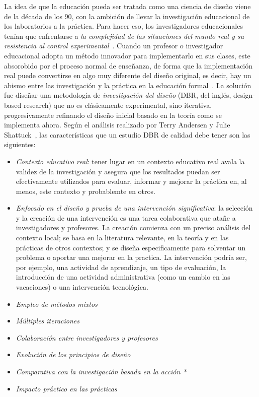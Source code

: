La idea de que la educación pueda ser tratada como una ciencia de diseño viene de la década de los 90, con la ambición de llevar la investigación educacional de los laboratorios a la práctica. Para hacer eso, los investigadores educacionales tenían que enfrentarse a \emph{la complejidad de las situaciones del mundo real y su resistencia al control experimental}~\cite{collins2004design}. Cuando un profesor o investigador educacional adopta un método innovador para implementarlo en sus clases, este absorobido por el proceso normal de enseñanza, de forma que la implementación real puede convertirse en algo muy diferente del diseño original, es decir, hay un abismo entre las investigación y la práctica en la educación formal~\cite{anderson2012design}. La solución fue diseñar una metodología de \emph{investigación del diseño} (DBR, del inglés, design-based research) que no es clásicamente experimental, sino iterativa, progresivamente refinando el diseño inicial basado en la teoría como se implementa ahora. Según el análisis realizado por Terry Andersen y Julie Shattuck~\cite{anderson2012design}, las características que un estudio DBR de calidad debe tener son las siguientes:
\begin{itemize}
\item \emph{Contexto educativo real}: tener lugar en un contexto educativo real avala la validez de la investigación y asegura que los resultados puedan ser efectivamente utilizados para evaluar, informar y mejorar la práctica en, al menos, este contexto y probablemte en otros.
\item \emph{Enfocado en el diseño y prueba de una intervención significativa}: la selección y la creación de una intervención es una tarea colaborativa que atañe a investigadores y profesores. La creación comienza con un preciso análisis del contexto local; se basa en la literatura relevante, en la teoría y en las prácticas de otros contextos; y se diseña especificamente para solventar un problema o aportar una mejorar en la practica. La intervención podría ser, por ejemplo, una actividad de aprendizaje, un tipo de evaluación, la introducción de una actividad administrativa (como un cambio en las vacaciones) o una intervención tecnológica. %
\item \emph{Empleo de métodos mixtos}
\item \emph{Múltiples iteraciones}
\item \emph{Colaboración entre investigadores y profesores}
\item \emph{Evolución de los principios de diseño}
\item \emph{Comparativa con la investigación basada en la acción *}
\item \emph{Impacto práctico en las prácticas}
\end{itemize}


